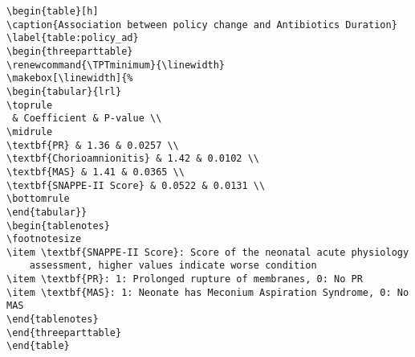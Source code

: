 \documentclass[11pt]{article}
\begin{document}
\begin{Verbatim}[tabsize=4]
\begin{table}[h]
\caption{Association between policy change and Antibiotics Duration}
\label{table:policy_ad}
\begin{threeparttable}
\renewcommand{\TPTminimum}{\linewidth}
\makebox[\linewidth]{%
\begin{tabular}{lrl}
\toprule
 & Coefficient & P-value \\
\midrule
\textbf{PR} & 1.36 & 0.0257 \\
\textbf{Chorioamnionitis} & 1.42 & 0.0102 \\
\textbf{MAS} & 1.41 & 0.0365 \\
\textbf{SNAPPE-II Score} & 0.0522 & 0.0131 \\
\bottomrule
\end{tabular}}
\begin{tablenotes}
\footnotesize
\item \textbf{SNAPPE-II Score}: Score of the neonatal acute physiology
	assessment, higher values indicate worse condition
\item \textbf{PR}: 1: Prolonged rupture of membranes, 0: No PR
\item \textbf{MAS}: 1: Neonate has Meconium Aspiration Syndrome, 0: No MAS
\end{tablenotes}
\end{threeparttable}
\end{table}

\end{Verbatim}




\end{document}
